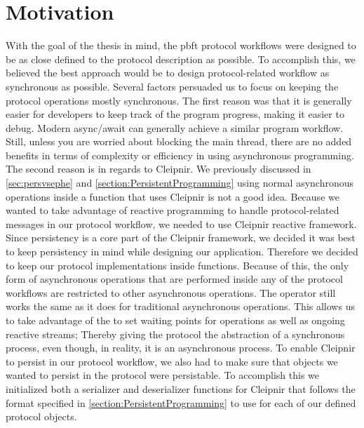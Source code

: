 \section{Motivation}
With the goal of the thesis in mind, the \ac{pbft} protocol workflows were designed to be as close defined to the protocol description as possible. To accomplish this, we believed the best approach would be to design protocol-related workflow as synchronous as possible. Several factors persuaded us to focus on keeping the protocol operations mostly synchronous. The first reason was that it is generally easier for developers to keep track of the program progress, making it easier to debug. Modern async/await can generally achieve a similar program workflow. Still, unless you are worried about blocking the main thread, there are no added benefits in terms of complexity or efficiency in using asynchronous programming. The second reason is in regards to Cleipnir. We previously discussed in \autoref{sec:persvsephe} and \autoref{section:PersistentProgramming} using normal asynchronous operations inside a function that uses Cleipnir is not a good idea. Because we wanted to take advantage of reactive programming to handle protocol-related messages in our protocol workflow, we needed to use Cleipnir reactive framework. Since persistency is a core part of the Cleipnir framework, we decided it was best to keep persistency in mind while designing our application. Therefore we decided to keep our protocol implementations inside  functions. Because of this, the only form of asynchronous operations that are performed inside any of the protocol workflows are restricted to other  asynchronous operations. The  operator still works the same as it does for traditional asynchronous operations. This allows us to take advantage of the  to set waiting points for  operations as well as ongoing reactive streams; Thereby giving the protocol the abstraction of a synchronous process, even though, in reality, it is an asynchronous process. 
To enable Cleipnir to persist in our protocol workflow, we also had to make sure that objects we wanted to persist in the protocol were persistable. To accomplish this we initialized both a serializer and deserializer functions for Cleipnir that follows the format specified in \autoref{section:PersistentProgramming} to use for each of our defined protocol objects.  
